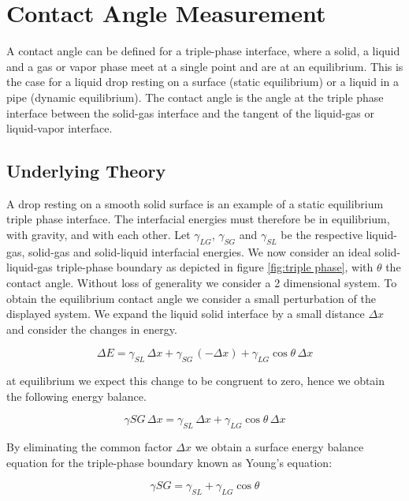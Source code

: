 \section{Contact Angle Measurement}

A contact angle can be defined for a triple-phase interface, where a solid, a liquid and a gas or vapor phase meet at a single point and are at an equilibrium. This is the case for a liquid drop resting on a surface (static equilibrium) or a liquid in a pipe (dynamic equilibrium). The contact angle is the angle at the triple phase interface between the solid-gas interface and the tangent of the liquid-gas or liquid-vapor interface.

\subsection{Underlying Theory}

A drop resting on a smooth solid surface is an example of a static equilibrium triple phase interface. The interfacial energies must therefore be in equilibrium, with gravity, and with each other. Let $\gamma_{LG}$, $\gamma_{SG}$ and $\gamma_{SL}$ be the respective liquid-gas, solid-gas and solid-liquid interfacial energies. We now consider an ideal solid-liquid-gas triple-phase boundary as depicted in figure \ref{fig:triple phase}, with $\theta$ the contact angle. Without loss of generality we consider a 2 dimensional system. To obtain the equilibrium contact angle we consider a small perturbation of the displayed system. We expand the liquid solid interface by a small distance $\Delta x$ and consider the changes in energy.

\begin{equation}
\Delta E = \gamma_{SL}\, \Delta x + \gamma_{SG} \, ( - \Delta x) + \gamma_{LG} \cos{\theta} \, \Delta x
\end{equation}

at equilibrium we expect this change to be congruent to zero, hence we obtain the following energy balance.

\begin{equation}
\gamma{SG} \, \Delta x = \gamma_{SL} \, \Delta x + \gamma_{LG} \cos{\theta}\, \Delta x
\end{equation}

By eliminating the common factor $\Delta x$ we obtain a surface energy balance equation for the triple-phase boundary known as Young's equation:


\begin{equation}
\gamma{SG} = \gamma_{SL} + \gamma_{LG} \cos{\theta}
\end{equation}

